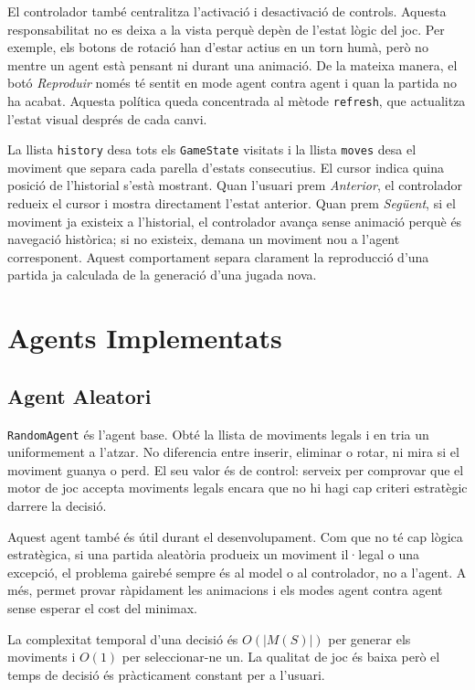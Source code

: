 \documentclass[conference,compsoc]{IEEEtran}
\begin{document}
El controlador també centralitza l'activació i desactivació de controls. Aquesta
responsabilitat no es deixa a la vista perquè depèn de l'estat lògic del joc. Per
exemple, els botons de rotació han d'estar actius en un torn humà, però no mentre
un agent està pensant ni durant una animació. De la mateixa manera, el botó
\textit{Reproduir} només té sentit en mode agent contra agent i quan la partida no
ha acabat. Aquesta política queda concentrada al mètode \texttt{refresh}, que
actualitza l'estat visual després de cada canvi.

La llista \texttt{history} desa tots els \texttt{GameState} visitats i la llista
\texttt{moves} desa el moviment que separa cada parella d'estats consecutius. El
cursor indica quina posició de l'historial s'està mostrant. Quan l'usuari prem
\textit{Anterior}, el controlador redueix el cursor i mostra directament l'estat
anterior. Quan prem \textit{Següent}, si el moviment ja existeix a l'historial, el
controlador avança sense animació perquè és navegació històrica; si no existeix,
demana un moviment nou a l'agent corresponent. Aquest comportament separa clarament
la reproducció d'una partida ja calculada de la generació d'una jugada nova.

\section{Agents Implementats}

\subsection{Agent Aleatori}

\texttt{RandomAgent} és l'agent base. Obté la llista de moviments legals i en tria
un uniformement a l'atzar. No diferencia entre inserir, eliminar o rotar, ni mira
si el moviment guanya o perd. El seu valor és de control: serveix per comprovar
que el motor de joc accepta moviments legals encara que no hi hagi cap criteri
estratègic darrere la decisió.

Aquest agent també és útil durant el desenvolupament. Com que no té cap lògica
estratègica, si una partida aleatòria produeix un moviment il·legal o una excepció,
el problema gairebé sempre és al model o al controlador, no a l'agent. A més,
permet provar ràpidament les animacions i els modes agent contra agent sense
esperar el cost del minimax.

La complexitat temporal d'una decisió és $O(|M(S)|)$ per generar els moviments i
$O(1)$ per seleccionar-ne un. La qualitat de joc és baixa però el temps de decisió
és pràcticament constant per a l'usuari.
\end{document}
